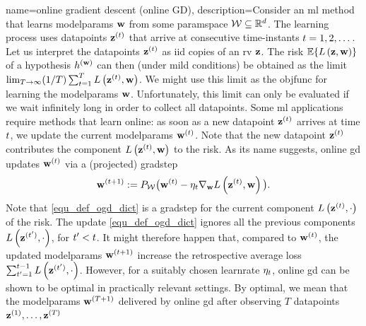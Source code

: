 {name={online gradient descent (online GD)}, 
	description={Consider  an \gls{ml} method that learns \gls{modelparams} 
		${\bf w}$ from some \gls{paramspace} $\mathcal{W} \subseteq \mathbb{R}^{d}$. 
		The learning process uses \gls{datapoint}s ${\bf z}^{(t)}$ that arrive at consecutive time-instants $t=1, 2, \dots$. 
		Let us interpret the \gls{datapoint}s ${\bf z}^{(t)}$ as \gls{iid} copies 
		of an \gls{rv} ${\bf z}$. The \gls{risk} $\mathbb{E}\{ L\left({\bf z},{\bf w} \right) \}$ of a 
		\gls{hypothesis} $h^{({\bf w})}$ can then (under mild conditions) be obtained as the limit 
		$\lim_{T\rightarrow \infty} (1/T)\sum_{t=1}^{T} L\left({\bf z}^{(t)},{\bf w} \right)$. 
		We might use this limit as the \gls{objfunc} for learning the \gls{modelparams} ${\bf w}$. 
		Unfortunately, this limit can only be evaluated if we wait infinitely long in order to collect all \gls{datapoint}s. 
		Some \gls{ml} applications require methods that learn online: as soon as a new \gls{datapoint} ${\bf z}^{(t)}$ 
		arrives at time $t$, we update the current \gls{modelparams} ${\bf w}^{(t)}$. Note that 
		the new \gls{datapoint} ${\bf z}^{(t)}$ contributes the component $L\left({\bf z}^{(t)},{\bf w} \right)$ 
		to the \gls{risk}. As its name suggests, online \gls{gd} updates ${\bf w}^{(t)}$ via a (projected) \gls{gradstep}
		\begin{equation} 
		\label{equ_def_ogd_dict}
 		{\bf w}^{(t+1)} := P_{\mathcal{W}}\big( {\bf w}^{(t)} - \eta_{t} \nabla_{{\bf w}} L\left({\bf z}^{(t)},{\bf w} \right)\big). 
		\end{equation} 
		Note that \eqref{equ_def_ogd_dict} is a \gls{gradstep} for the current component $L\left({\bf z}^{(t)},\cdot \right)$ 
		of the \gls{risk}. The update \eqref{equ_def_ogd_dict} ignores all the previous components $L\left({\bf z}^{(t')},\cdot \right)$, 
		for $t' < t$. It might therefore happen that, compared to ${\bf w}^{(t)}$, the updated \gls{modelparams} 
		${\bf w}^{(t+1)}$ increase the retrospective average \gls{loss} $\sum_{t'=1}^{t-1} L\left({\bf z}^{(t')},\cdot \right)$. 
		However, for a suitably chosen \gls{learnrate} $\eta_{t}$, online \gls{gd} can be shown 
		to be optimal in practically relevant settings. By optimal, we mean that the \gls{modelparams} 
		${\bf w}^{(T+1)}$ delivered by online \gls{gd} after observing $T$ \gls{datapoint}s ${\bf z}^{(1)}, \ldots, {\bf z}^{(T)}$ 
}}
